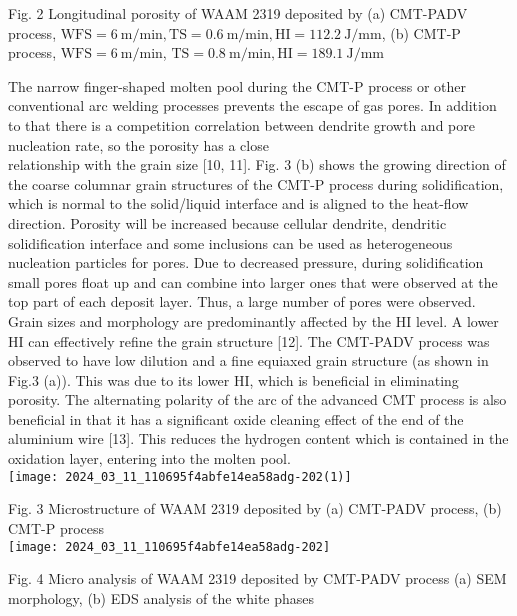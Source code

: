 \documentclass[10pt]{article}
\begin{document}
Fig. 2 Longitudinal porosity of WAAM 2319 deposited by (a) CMT-PADV process, $\mathrm{WFS}=6 \mathrm{~m} / \mathrm{min}, \mathrm{TS}=0.6 \mathrm{~m} / \mathrm{min}, \mathrm{HI}=112.2 \mathrm{~J} / \mathrm{mm}$, (b) CMT-P process, $\mathrm{WFS}=6 \mathrm{~m} / \mathrm{min}$, $\mathrm{TS}=0.8 \mathrm{~m} / \mathrm{min}, \mathrm{HI}=189.1 \mathrm{~J} / \mathrm{mm}$

The narrow finger-shaped molten pool during the CMT-P process or other conventional arc welding processes prevents the escape of gas pores. In addition to that there is a competition correlation between dendrite growth and pore nucleation rate, so the porosity has a close\\
relationship with the grain size [10, 11]. Fig. 3 (b) shows the growing direction of the coarse columnar grain structures of the CMT-P process during solidification, which is normal to the solid/liquid interface and is aligned to the heat-flow direction. Porosity will be increased because cellular dendrite, dendritic solidification interface and some inclusions can be used as heterogeneous nucleation particles for pores. Due to decreased pressure, during solidification small pores float up and can combine into larger ones that were observed at the top part of each deposit layer. Thus, a large number of pores were observed. Grain sizes and morphology are predominantly affected by the HI level. A lower HI can effectively refine the grain structure [12]. The CMT-PADV process was observed to have low dilution and a fine equiaxed grain structure (as shown in Fig.3 (a)). This was due to its lower HI, which is beneficial in eliminating porosity. The alternating polarity of the arc of the advanced CMT process is also beneficial in that it has a significant oxide cleaning effect of the end of the aluminium wire [13]. This reduces the hydrogen content which is contained in the oxidation layer, entering into the molten pool.\\
\texttt{[image: 2024\_03\_11\_110695f4abfe14ea58adg-202(1)]}

Fig. 3 Microstructure of WAAM 2319 deposited by (a) CMT-PADV process, (b) CMT-P process\\
\texttt{[image: 2024\_03\_11\_110695f4abfe14ea58adg-202]}

Fig. 4 Micro analysis of WAAM 2319 deposited by CMT-PADV process (a) SEM morphology, (b) EDS analysis of the white phases
\end{document}
